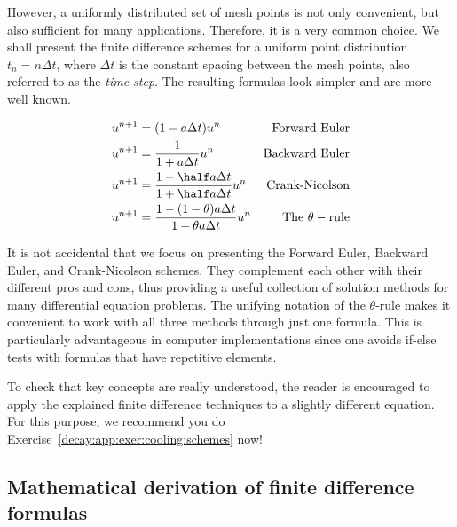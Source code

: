 \documentclass[graybox,sectrefs,envcountresetchap,open=right,final]{svmonodo}
\newenvironment{summary_mdfboxadmon}[1][]{
\begin{summary_mdfboxmdframed}[frametitle=#1]
}
{
\end{summary_mdfboxmdframed}
}
\newenvironment{question_mdfboxadmon}[1][]{
\begin{question_mdfboxmdframed}[frametitle=#1]
}
{
\end{question_mdfboxmdframed}
}
\begin{document}

However, a uniformly distributed set of mesh points is not only
convenient, but also
sufficient for many applications. Therefore, it is a very common
choice. We shall
present the finite difference schemes for a uniform point distribution
$t_n=n\Delta t$, where $\Delta t$ is the constant spacing between
the mesh points, also referred to as the \emph{time step}.
The resulting formulas look simpler and are more
well known.


\begin{summary_mdfboxadmon}
\begin{alignat}{2}
u^{n+1} &= (1 - a\Delta t )u^n  & \hbox{Forward Euler}
\label{decay:FE:u}\\ 
u^{n+1} &= \frac{1}{1+ a\Delta t} u^n  & \hbox{Backward Euler}
\label{decay:BE:u}\\ 
u^{n+1} &= \frac{1-\half a\Delta t}{1 + \half a\Delta t} u^n & \hbox{Crank-Nicolson}
\label{decay:CN:u}\\ 
u^{n+1} &= \frac{1 - (1-\theta) a\Delta t}{1 + \theta a \Delta t}u^n  & \hbox{The }\theta-\hbox{rule}
\label{decay:th:u}
\end{alignat}
\end{summary_mdfboxadmon} %



It is not accidental that we focus on presenting the Forward Euler, Backward
Euler, and Crank-Nicolson schemes. They complement each other with their
different pros and cons, thus providing a useful collection of
solution methods for many differential equation problems.
The unifying notation of the $\theta$-rule makes it convenient to
work with all three methods through just one formula. This is
particularly advantageous in computer implementations since one avoids
if-else tests with formulas that have repetitive elements.


\begin{question_mdfboxadmon}
To check that key concepts are really understood, the reader is
encouraged to apply the explained finite difference techniques
to a slightly different equation. For this purpose, we recommend
you do Exercise~\ref{decay:app:exer:cooling:schemes} now!
\end{question_mdfboxadmon} %



\subsection{Mathematical derivation of finite difference formulas}
\label{decay:fd:taylor}
\end{document}
